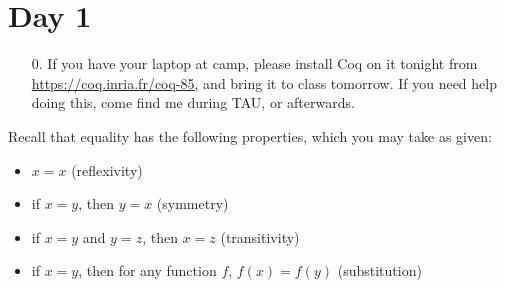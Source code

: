\documentclass{article}
\begin{document}
\section*{Day 1}

\begin{enumerate}
  \item[0.]
    If you have your laptop at camp, please install Coq on it tonight from \url{https://coq.inria.fr/coq-85}, and bring it to class tomorrow.  If you need help doing this, come find me during TAU, or afterwards.
\end{enumerate}

\noindent Recall that equality has the following properties, which you may take as given:
\begin{itemize}
  \item $x = x$ (reflexivity)
  \item if $x = y$, then $y = x$ (symmetry)
  \item if $x = y$ and $y = z$, then $x = z$ (transitivity)
  \item if $x = y$, then for any function $f$, $f(x) = f(y)$ (substitution)
\end{itemize}
\end{document}
